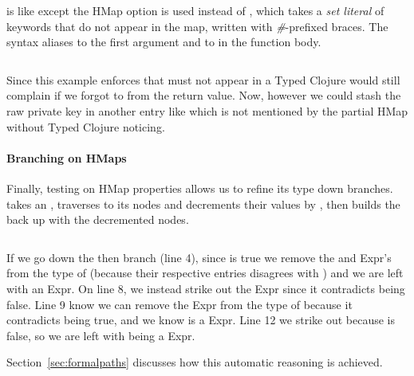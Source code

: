 is like 
except the  HMap option is used
instead of ,
which takes a \emph{set literal} of keywords that do not appear in the map, written 
with \emph{\#}-prefixed braces.
The syntax 
aliases  to the first argument and  to 
in the function body.

\begin{exmp}
\inputminted[firstline=10,lastline=21]{clojure}{code/demo/src/demo/key2.clj}
\label{example:absentkeys}
\end{exmp}

Since this example enforces that  must not appear
in a 
Typed Clojure would still complain if we forgot to  
from the return value.
Now, however we could stash the raw private key in another entry
like  which is not mentioned by the partial HMap 
without Typed Clojure noticing.

\paragraph{Branching on HMaps} Finally, testing on HMap properties
allows us to refine its type down branches.  takes an
, traverses to its nodes and decrements their values by , then
builds the  back up with the decremented nodes.

\begin{exmp}
\inputminted[linenos,firstnumber=1,firstline=15,lastline=27]{clojure}{code/demo/src/demo/hmap.clj}
\label{example:decmap}
\end{exmp}

If we go down the then branch (line 4), since  is true
we remove
the  and 
Expr's from the type of  (because their respective  entries disagrees with )
and we are left with an  Expr.
On line 8,
we instead strike out the  Expr since it contradicts  being false. 
Line 9 know we can
remove the  Expr from the type of  because it contradicts  being true,
and we know  is a  Expr.
Line 12 we strike out  because  is false,
so we are left with  being a  Expr.

Section~\ref{sec:formalpaths} discusses how this automatic reasoning is achieved.

